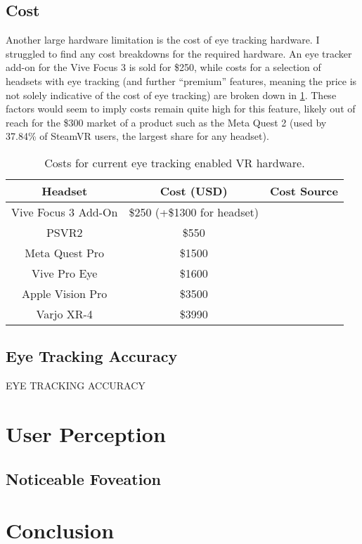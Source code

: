 \documentclass[a4paper,11pt]{article}
\begin{document}
\subsection{Cost}
Another large hardware limitation is the cost of eye tracking hardware. I struggled to find any cost breakdowns for the required hardware. An eye tracker add-on for the Vive Focus 3 is sold for \$250\cite{eye_cost_vive}, while costs for a selection of headsets with eye tracking (and further ``premium'' features, meaning the price is not solely indicative of the cost of eye tracking) are broken down in \cref{tab:costs}. These factors would seem to imply costs remain quite high for this feature, likely out of reach for the \$300\cite{quest_two_price} market of a product such as the Meta Quest 2 (used by 37.84\% of SteamVR users, the largest share for any headset).
\begin{table}
  \begin{center}
    \begin{tabular}{|c|c|c|}
      \hline
      Headset & Cost (USD) & Cost Source\\
      \hline
      Vive Focus 3 Add-On & \$250 (+\$1300 for headset) & \cite{eye_cost_vive, focus_price}\\
      \hline
       PSVR2 & \$550 & \cite{psvr_price}\\
       \hline
       Meta Quest Pro & \$1500 & \cite{quest_pro_price}\\
       \hline
       Vive Pro Eye & \$1600 & \cite{vive_pro_eye}\\
       \hline
       Apple Vision Pro & \$3500 & \cite{vision_pro_price}\\
       \hline
       Varjo XR-4 & \$3990 & \cite{varjo_price}\\
       \hline
    \end{tabular}
  \end{center}
  \caption{Costs for current eye tracking enabled VR hardware.}
  \label{tab:costs}
\end{table}

\subsection{Eye Tracking Accuracy}
EYE TRACKING ACCURACY

\section{User Perception}
\subsection{Noticeable Foveation}

\section{Conclusion}

\printbibliography
\end{document}
